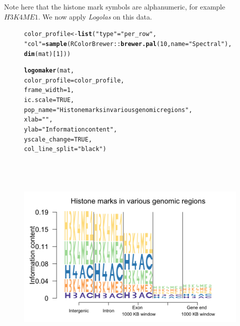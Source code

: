 \documentclass[12pt]{article}\usepackage[]{graphicx}\usepackage[usenames,dvipsnames]{color}
\makeatletter
\newcommand{\hlnum}[1]{\textcolor[rgb]{0.686,0.059,0.569}{#1}}%
\newcommand{\hlstr}[1]{\textcolor[rgb]{0.192,0.494,0.8}{#1}}%
\newcommand{\hlopt}[1]{\textcolor[rgb]{0,0,0}{#1}}%
\newcommand{\hlstd}[1]{\textcolor[rgb]{0.345,0.345,0.345}{#1}}%
\newcommand{\hlkwb}[1]{\textcolor[rgb]{0.69,0.353,0.396}{#1}}%
\newcommand{\hlkwc}[1]{\textcolor[rgb]{0.333,0.667,0.333}{#1}}%
\newcommand{\hlkwd}[1]{\textcolor[rgb]{0.737,0.353,0.396}{\textbf{#1}}}%
\newenvironment{kframe}{%
 \def\at@end@of@kframe{}%
 \ifinner\ifhmode%
  \def\at@end@of@kframe{\end{minipage}}%
  \begin{minipage}{\columnwidth}%
 \fi\fi%
 \def\FrameCommand##1{\hskip\@totalleftmargin \hskip-\fboxsep
 \colorbox{shadecolor}{##1}\hskip-\fboxsep
     \hskip-\linewidth \hskip-\@totalleftmargin \hskip\columnwidth}%
 \MakeFramed {\advance\hsize-\width
   \@totalleftmargin\z@ \linewidth\hsize
   \@setminipage}}%
 {\par\unskip\endMakeFramed%
 \at@end@of@kframe}
\newenvironment{knitrout}{}{} %
\newcommand{\Logolas}{\textit{Logolas}}
\makeatother
\begin{document}
Note here that the histone mark symbols are alphanumeric, for example $H3K4ME1$.
We now apply \Logolas{} on this data.

\begin{figure}[h]
\begin{center}
\begin{knitrout}
\color{fgcolor}\begin{kframe}
\begin{alltt}
\hlstd{color_profile} \hlkwb{<-} \hlkwd{list}\hlstd{(}\hlstr{"type"} \hlstd{=} \hlstr{"per_row"}\hlstd{,}
                      \hlstr{"col"} \hlstd{=} \hlkwd{sample}\hlstd{(RColorBrewer}\hlopt{::}\hlkwd{brewer.pal}\hlstd{(}\hlnum{10}\hlstd{,}\hlkwc{name} \hlstd{=} \hlstr{"Spectral"}\hlstd{),}
                          \hlkwd{dim}\hlstd{(mat)[}\hlnum{1}\hlstd{]))}


\hlkwd{logomaker}\hlstd{(mat,}
          \hlkwc{color_profile} \hlstd{= color_profile,}
          \hlkwc{frame_width} \hlstd{=} \hlnum{1}\hlstd{,}
          \hlkwc{ic.scale} \hlstd{=} \hlnum{TRUE}\hlstd{,}
          \hlkwc{pop_name} \hlstd{=} \hlstr{"Histone marks in various genomic regions"}\hlstd{,}
          \hlkwc{xlab} \hlstd{=} \hlstr{""}\hlstd{,}
          \hlkwc{ylab} \hlstd{=} \hlstr{"Information content"}\hlstd{,}
          \hlkwc{yscale_change} \hlstd{=} \hlnum{TRUE}\hlstd{,}
          \hlkwc{col_line_split} \hlstd{=} \hlstr{"black"}\hlstd{)}
\end{alltt}
\end{kframe}
\includegraphics[width=6.5in,height=4in]{figure/histone_logolas-1} 

\end{knitrout}
\end{center}
\end{figure}
\end{document}

